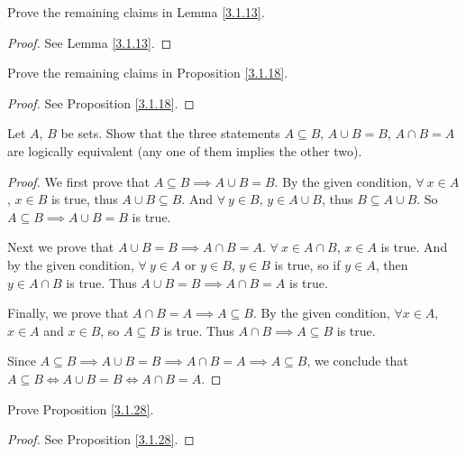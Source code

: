 \begin{exercise}\label{ex 3.1.3}
Prove the remaining claims in Lemma \ref{3.1.13}.
\end{exercise}

\begin{proof}
See Lemma \ref{3.1.13}.
\end{proof}

\begin{exercise}\label{ex 3.1.4}
Prove the remaining claims in Proposition \ref{3.1.18}.
\end{exercise}

\begin{proof}
See Proposition \ref{3.1.18}.
\end{proof}

\begin{exercise}\label{ex 3.1.5}
Let \(A\), \(B\) be sets.
Show that the three statements \(A \subseteq B\), \(A \cup B = B\), \(A \cap B = A\) are logically equivalent (any one of them implies the other two).
\end{exercise}

\begin{proof}
We first prove that \(A \subseteq B \implies A \cup B = B\).
By the given condition, \(\forall\ x \in A\), \(x \in B\) is true, thus \(A \cup B \subseteq B\).
And \(\forall\ y \in B\), \(y \in A \cup B\), thus \(B \subseteq A \cup B\).
So \(A \subseteq B \implies A \cup B = B\) is true.

Next we prove that \(A \cup B = B \implies A \cap B = A\).
\(\forall\ x \in A \cap B\), \(x \in A\) is true.
And by the given condition, \(\forall\ y \in A\) or \(y \in B\), \(y \in B\) is true, so if \(y \in A\), then \(y \in A \cap B\) is true.
Thus \(A \cup B = B \implies A \cap B = A\) is true.

Finally, we prove that \(A \cap B = A \implies A \subseteq B\).
By the given condition, \(\forall x \in A\), \(x \in A\) and \(x \in B\), so \(A \subseteq B\) is true.
Thus \(A \cap B \implies A \subseteq B\) is true.

Since \(A \subseteq B \implies A \cup B = B \implies A \cap B = A \implies A \subseteq B\), we conclude that \(A \subseteq B \iff A \cup B = B \iff A \cap B = A\).
\end{proof}

\begin{exercise}\label{ex 3.1.6}
Prove Proposition \ref{3.1.28}.
\end{exercise}

\begin{proof}
See Proposition \ref{3.1.28}.
\end{proof}

